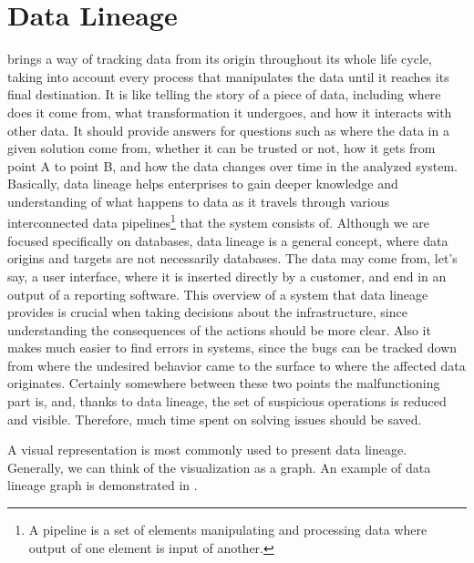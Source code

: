 \section{Data Lineage}

 brings a way of tracking data from its origin throughout its whole life cycle, taking into account every process that manipulates the data until it reaches its final destination. 
It is like telling the story of a piece of data, including where does it come from, what transformation it undergoes, and how it interacts with other data.
It should provide answers for questions such as where the data in a given solution come from, whether it can be trusted or not, how it gets from point A to point B, and how the data changes over time in the analyzed system.
Basically, data lineage helps enterprises to gain deeper knowledge and understanding of what happens to data as it travels through various interconnected data pipelines\footnote{A pipeline is a set of elements manipulating and processing data where output of one element is input of another.} that the system consists of. Although we are focused specifically on databases, data lineage is a general concept, where data origins and targets are not necessarily databases. The data may come from, let's say, a user interface, where it is inserted directly by a customer, and end in an output of a reporting software.
This overview of a system that data lineage provides is crucial when taking decisions about the infrastructure, since understanding the consequences of the actions should be more clear. Also it makes much easier to find errors in systems, since the bugs can be tracked down from where the undesired behavior came to the surface to where the affected data originates. 
Certainly somewhere between these two points the malfunctioning part is, and, thanks to data lineage, the set of suspicious operations is reduced and visible. 
Therefore, much time spent on solving issues should be saved.

A visual representation is most commonly used to present data lineage. 
Generally, we can think of the visualization as a graph. An example of data lineage graph is demonstrated in .

